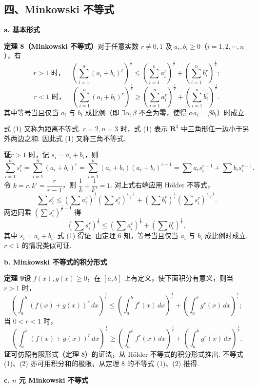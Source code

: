\documentclass[UTF8,12pt,a4paper,fontset=fandol]{ctexart}
\begin{document}
\subsection*{四、Minkowski 不等式}

\noindent\textbf{a. 基本形式}

\noindent\textbf{定理 8（Minkowski 不等式）}\quad 对于任意实数 $r\ne0,1$ 及 $a_i,b_i\ge0$（$i=1,2,\cdots,n$），有
\[
r>1\text{ 时，}\quad
\left(\sum_{i=1}^n(a_i+b_i)^r\right)^{\frac1r}
\le\left(\sum_{i=1}^n a_i^r\right)^{\frac1r}
+\left(\sum_{i=1}^n b_i^r\right)^{\frac1r}; \tag{1}
\]
\[
r<1\text{ 时，}\quad
\left(\sum_{i=1}^n(a_i+b_i)^r\right)^{\frac1r}
\ge\left(\sum_{i=1}^n a_i^r\right)^{\frac1r}
+\left(\sum_{i=1}^n b_i^r\right)^{\frac1r}. \tag{2}
\]
其中等号当且仅当 $a_i$ 与 $b_i$ 成比例（即 $\exists\alpha,\beta$ 不全为零，使得 $\alpha a_i=\beta b_i$）时成立.

式 (1) 又称为距离不等式. $r=2,n=3$ 时，式 (1) 表示 $\mathbf{R}^3$ 中三角形任一边小于另外两边之和. 因此式 (1) 又称三角不等式.

\noindent\textbf{证}\quad $r>1$ 时，记 $s_i=a_i+b_i$，则
\[
\sum_{i=1}^n s_i^r
=\sum_{i=1}^n(a_i+b_i)^r
=\sum_{i=1}^n(a_i+b_i)(a_i+b_i)^{r-1}
=\sum a_i s_i^{r-1}+\sum b_i s_i^{r-1}.
\]
令 $k=r,k'=\dfrac r{r-1}$，则 $\dfrac1k+\dfrac1{k'}=1$. 对上式右端应用 Hölder 不等式，
\[
\sum s_i^r
\le \left(\sum a_i^r\right)^{\frac1r}\left(\sum s_i^r\right)^{\frac{r-1}{r}}
+\left(\sum b_i^r\right)^{\frac1r}\left(\sum s_i^r\right)^{\frac{r-1}{r}}.
\]
两边同乘 $\left(\sum s_i^r\right)^{\frac1r-1}$ 得
\[
\left(\sum s_i^r\right)^{\frac1r}
\le\left(\sum a_i^r\right)^{\frac1r}
+\left(\sum b_i^r\right)^{\frac1r},
\]
其中 $s_i=a_i+b_i$. 式 (1) 得证. 由定理 6 知，等号当且仅当 $a_i$ 与 $b_i$ 成比例时成立.
$r<1$ 的情况类似可证.

\noindent\textbf{b. Minkowski 不等式的积分形式}

\noindent\textbf{定理 9}\quad 设 $f(x),g(x)\ge0$，在 $[a,b]$ 上有定义，使下面积分有意义，则当 $r>1$ 时，
\[
\left(\int_a^b(f(x)+g(x))^r\,dx\right)^{\frac1r}
\le \left(\int_a^b f^r(x)\,dx\right)^{\frac1r}
+\left(\int_a^b g^r(x)\,dx\right)^{\frac1r}; \tag{1}
\]
当 $0<r<1$ 时，
\[
\left(\int_a^b(f(x)+g(x))^r\,dx\right)^{\frac1r}
\ge \left(\int_a^b f^r(x)\,dx\right)^{\frac1r}
+\left(\int_a^b g^r(x)\,dx\right)^{\frac1r}. \tag{2}
\]
\noindent\textbf{证}\quad 可仿照有限形式（定理 8）的证法，从 Hölder 不等式的积分形式推出. 不等式 (1)、(2) 亦可用积分和的极限，从定理 8 的不等式 (1)、(2) 推得.

\noindent\textbf{c. $n$ 元 Minkowski 不等式}
\end{document}
